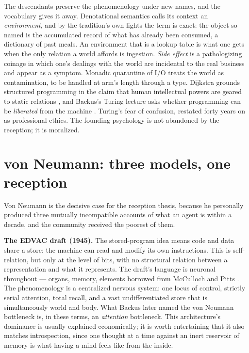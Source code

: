 The descendants preserve the phenomenology under new names, and the
vocabulary gives it away.
Denotational semantics calls its context an \emph{environment}, and
by the tradition's own lights the term is exact: the object so named
is the accumulated record of what has already been consumed, a
dictionary of past meals.
An environment that is a lookup table is what one gets when the only
relation a world affords is ingestion.
\emph{Side effect} is a pathologizing coinage in which one's
dealings with the world are incidental to the real business and
appear as a symptom.
Monadic quarantine of I/O treats the world as contamination, to be
handled at arm's length through a type.
Dijkstra grounds structured programming in the claim that human
intellectual powers are geared to static relations
\cite{dijkstra1968,dijkstra1972}, and Backus's Turing lecture asks
whether programming can be \emph{liberated} from the machine
\cite{backus1978}.
Turing's fear of confusion, restated forty years on as professional
ethics.
The founding psychology is not abandoned by the reception; it is
moralized.

\section{von Neumann: three models, one reception}
\label{psy:sec:vn}

Von Neumann is the decisive case for the reception thesis, because
he personally produced three mutually incompatible accounts of what
an agent is within a decade, and the community received the poorest
of them.

\textbf{The EDVAC draft (1945).}
The stored-program idea means code and data share a store: the
machine can read and modify its own instructions.
This is self-relation, but only at the level of bits, with no
structural relation between a representation and what it represents.
The draft's language is neuronal throughout --- organs, memory,
elements borrowed from McCulloch and Pitts
\cite{vonneumann1945,mcp}.
The phenomenology is a centralized nervous system: one locus of
control, strictly serial attention, total recall, and a vast
undifferentiated store that is simultaneously world and body.
What Backus later named the von Neumann bottleneck is, in these
terms, an \emph{attention} bottleneck.
This architecture's dominance is usually explained economically; it
is worth entertaining that it also matches introspection, since one
thought at a time against an inert reservoir of memory is what
having a mind feels like from the inside.

